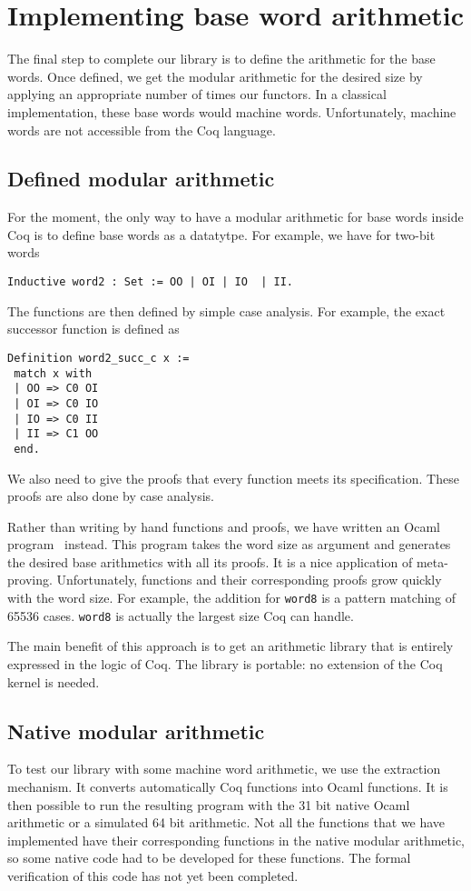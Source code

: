 \section{Implementing base word arithmetic \label{word}}

The final step to complete our library is to define the arithmetic for the base words. 
Once defined,  we get the modular arithmetic for the desired size by applying an appropriate
number of times our functors. In a classical implementation, these base words would machine words.
Unfortunately, machine words are not accessible from the {\sc Coq} language. 

\subsection{Defined modular arithmetic}

For the moment, the only way to have a modular arithmetic for base words inside {\sc Coq}
is to define base words as a datatytpe. For example, we have for two-bit words
\begin{verbatim}
Inductive word2 : Set := OO | OI | IO  | II.
\end{verbatim}
The functions are then defined by simple case analysis. For example,
the exact successor function is defined as
\begin{verbatim}
Definition word2_succ_c x :=
 match x with
 | OO => C0 OI
 | OI => C0 IO
 | IO => C0 II
 | II => C1 OO
 end.
\end{verbatim}
We also need to give the proofs that every function meets its specification.
These proofs are also done by case analysis. 

Rather than writing by hand functions and proofs, we have
written an {\sc Ocaml} program~\cite{ocaml} instead. This program takes the word
size as argument and generates the desired base arithmetics with all
its proofs. It is a nice application of meta-proving. Unfortunately, 
functions and their corresponding proofs grow quickly with the word size. 
For example, the addition for {\tt word8} is a pattern matching of 65536 cases. 
{\tt word8} is actually the largest size {\sc Coq} can handle. 

The main benefit of  this approach is to get an arithmetic library that is entirely expressed 
in the logic of {\sc Coq}. The library is portable: no extension of the {\sc Coq} kernel 
is needed. 

\subsection{Native modular arithmetic}

To test our library with some machine word arithmetic, we use the extraction
mechanism. It converts automatically {\sc Coq} functions into {\sc Ocaml} functions.
It is then possible to run the resulting program with the 31 bit native
{\sc Ocaml} arithmetic or a simulated 64 bit arithmetic. 
Not all the functions that we have implemented have their corresponding functions in the 
native modular arithmetic, so some native code had to be developed for these functions.
The formal verification of this code has not yet been completed.